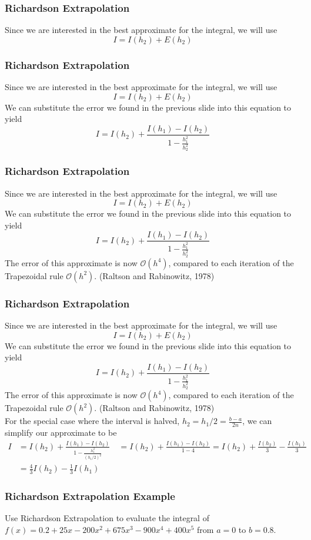 \documentclass{if-beamer}
\begin{document}
\begin{frame}[t]
	\frametitle{Richardson Extrapolation}
	Since we are interested in the best approximate for the integral, we will use
	$$ I = I(h_2)+E(h_2)$$
\end{frame}

\begin{frame}[t]
	\frametitle{Richardson Extrapolation}
	Since we are interested in the best approximate for the integral, we will use
	$$ I = I(h_2)+E(h_2)$$
	We can substitute the error we found in the previous slide into this equation to yield 
	$$ I = I(h_2) + \frac{I(h_1)-I(h_2)}{1-\frac{h_1^2}{h_2^2}}$$
\end{frame}

\begin{frame}[t]
	\frametitle{Richardson Extrapolation}
	Since we are interested in the best approximate for the integral, we will use
	$$ I = I(h_2)+E(h_2)$$
	We can substitute the error we found in the previous slide into this equation to yield 
	$$ I = I(h_2) + \frac{I(h_1)-I(h_2)}{1-\frac{h_1^2}{h_2^2}}$$
	The error of this approximate is now $\mathcal{O}(h^4)$, compared to each iteration of the Trapezoidal rule $\mathcal{O}(h^2)$. (Raltson and Rabinowitz, 1978)\\\vspace{10pt} 
\end{frame}

\begin{frame}[t]
	\frametitle{Richardson Extrapolation}
Since we are interested in the best approximate for the integral, we will use
$$ I = I(h_2)+E(h_2)$$
We can substitute the error we found in the previous slide into this equation to yield 
$$ I = I(h_2) + \frac{I(h_1)-I(h_2)}{1-\frac{h_1^2}{h_2^2}}$$
The error of this approximate is now $\mathcal{O}(h^4)$, compared to each iteration of the Trapezoidal rule $\mathcal{O}(h^2)$. (Raltson and Rabinowitz, 1978)\\\vspace{10pt} 
For the special case where the interval is halved, $h_2 = h_1/2 = \frac{b-a}{2n}$, we can simplify our approximate to be
\begin{align*}
I &= I(h_2) + \frac{I(h_1)-I(h_2)}{1-\frac{h_1^2}{(h_1/2)^2}} \quad = I(h_2) + \frac{I(h_1)-I(h_2)}{1-4} = I(h_2) + \frac{I(h_2)}{3} - \frac{I(h_1)}{3} \\
 & = \frac{4}{3}I(h_2)- \frac{1}{3}I(h_1)	
\end{align*}
\end{frame}

\begin{frame}[t]
	\frametitle{Richardson Extrapolation Example}
	Use Richardson Extrapolation to evaluate the integral of\\ $f(x) = 0.2 + 25x-200x^2+675x^3-900x^4+400x^5$ from $a = 0$ to $b = 0.8$. \\\vspace{10pt}
\end{frame}
\end{document}
